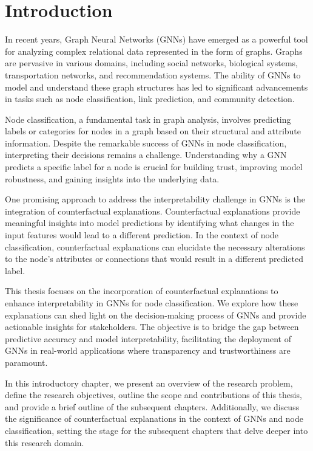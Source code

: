 \documentclass[binding=0.6cm,LaM]{sapthesis}
\begin{document}
\tableofcontents
\mainmatter

\chapter{Introduction}
\label{chap:1} 
In recent years, Graph Neural Networks (GNNs) have emerged as a powerful tool for analyzing complex relational data represented in the form of graphs. Graphs are pervasive in various domains, including social networks, biological systems, transportation networks, and recommendation systems. The ability of GNNs to model and understand these graph structures has led to significant advancements in tasks such as node classification, link prediction, and community detection.

Node classification, a fundamental task in graph analysis, involves predicting labels or categories for nodes in a graph based on their structural and attribute information. Despite the remarkable success of GNNs in node classification, interpreting their decisions remains a challenge. Understanding why a GNN predicts a specific label for a node is crucial for building trust, improving model robustness, and gaining insights into the underlying data.

One promising approach to address the interpretability challenge in GNNs is the integration of counterfactual explanations. Counterfactual explanations provide meaningful insights into model predictions by identifying what changes in the input features would lead to a different prediction. In the context of node classification, counterfactual explanations can elucidate the necessary alterations to the node's attributes or connections that would result in a different predicted label.

This thesis focuses on the incorporation of counterfactual explanations to enhance interpretability in GNNs for node classification. We explore how these explanations can shed light on the decision-making process of GNNs and provide actionable insights for stakeholders. The objective is to bridge the gap between predictive accuracy and model interpretability, facilitating the deployment of GNNs in real-world applications where transparency and trustworthiness are paramount.

In this introductory chapter, we present an overview of the research problem, define the research objectives, outline the scope and contributions of this thesis, and provide a brief outline of the subsequent chapters. Additionally, we discuss the significance of counterfactual explanations in the context of GNNs and node classification, setting the stage for the subsequent chapters that delve deeper into this research domain.
\end{document}

